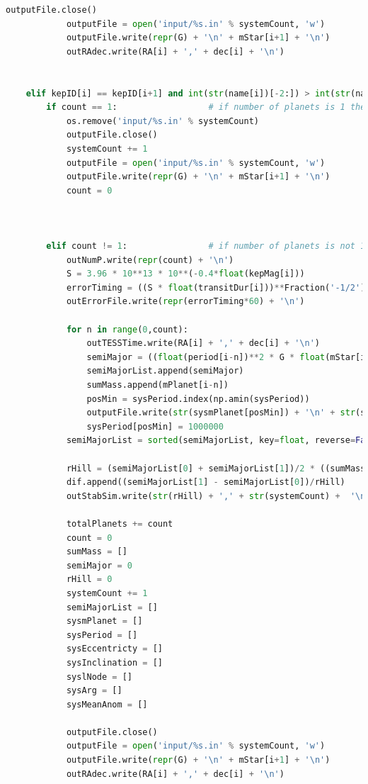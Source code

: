 \documentclass[12pt]{report}
\begin{document}
\begin{appendix}
\begin{lstlisting}[language=Python]
			outputFile.close()
			outputFile = open('input/%s.in' % systemCount, 'w')
			outputFile.write(repr(G) + '\n' + mStar[i+1] + '\n')	
			outRAdec.write(RA[i] + ',' + dec[i] + '\n')
			
			
	elif kepID[i] == kepID[i+1] and int(str(name[i])[-2:]) > int(str(name[i+1])[-2:]):
		if count == 1:					# if number of planets is 1 the file is removed
			os.remove('input/%s.in' % systemCount)
			outputFile.close()
			systemCount += 1
			outputFile = open('input/%s.in' % systemCount, 'w')
			outputFile.write(repr(G) + '\n' + mStar[i+1] + '\n')
			count = 0

			
			
		elif count != 1:				# if number of planets is not 1 the rest of the data is saved and a new file is created
			outNumP.write(repr(count) + '\n')
			S = 3.96 * 10**13 * 10**(-0.4*float(kepMag[i]))			
			errorTiming = ((S * float(transitDur[i]))**Fraction('-1/2') * ((float(rPlanet[i])*0.009158)/float(rStar[i]))**Fraction('-3/2') * float(transitDur[i]))		
			outErrorFile.write(repr(errorTiming*60) + '\n') 		
			
			for n in range(0,count):
				outTESSTime.write(RA[i] + ',' + dec[i] + '\n')
				semiMajor = ((float(period[i-n])**2 * G * float(mStar[i]))/(4 * math.pi**2))**Fraction('1/3')
				semiMajorList.append(semiMajor)
				sumMass.append(mPlanet[i-n])
				posMin = sysPeriod.index(np.amin(sysPeriod))
				outputFile.write(str(sysmPlanet[posMin]) + '\n' + str(sysPeriod[posMin]) + ' ' + repr(sysEccentricty[posMin]) + ' ' + repr(sysInclination[posMin]) + ' ' + repr(syslNode[posMin]) + '  ' + repr(sysArg[posMin]) + ' ' + repr(sysMeanAnom[posMin]) + '\n')
				sysPeriod[posMin] = 1000000
			semiMajorList = sorted(semiMajorList, key=float, reverse=False)
			
			rHill = (semiMajorList[0] + semiMajorList[1])/2 * ((sumMass[0] + sumMass[1])/(3*float(mStar[i]))**Fraction('1/3'))
			dif.append((semiMajorList[1] - semiMajorList[0])/rHill)
			outStabSim.write(str(rHill) + ',' + str(systemCount) +  '\n')
			
			totalPlanets += count	
			count = 0
			sumMass = []
			semiMajor = 0
			rHill = 0
			systemCount += 1
			semiMajorList = []
			sysmPlanet = []
			sysPeriod = []
			sysEccentricty = []
			sysInclination = []
			syslNode = []
			sysArg = []
			sysMeanAnom = []
			
			outputFile.close()
			outputFile = open('input/%s.in' % systemCount, 'w')
			outputFile.write(repr(G) + '\n' + mStar[i+1] + '\n')	
			outRAdec.write(RA[i] + ',' + dec[i] + '\n')
			

\end{lstlisting}
\end{appendix}
\end{document}
